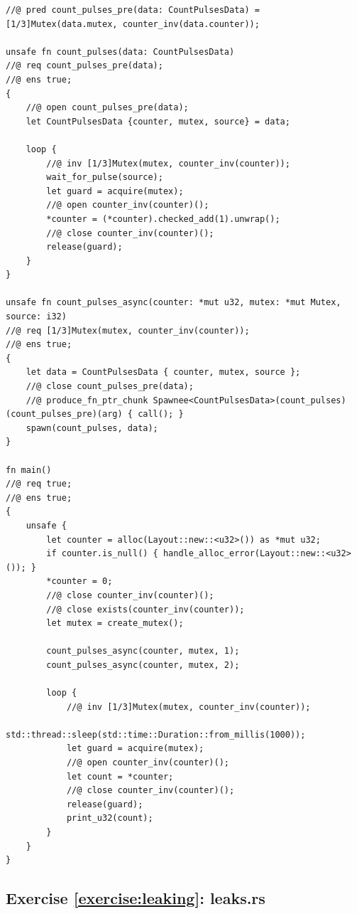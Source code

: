 \documentclass{article}
\begin{document}
\begin{lstlisting}
//@ pred count_pulses_pre(data: CountPulsesData) = [1/3]Mutex(data.mutex, counter_inv(data.counter));

unsafe fn count_pulses(data: CountPulsesData)
//@ req count_pulses_pre(data);
//@ ens true;
{
    //@ open count_pulses_pre(data);
    let CountPulsesData {counter, mutex, source} = data;

    loop {
        //@ inv [1/3]Mutex(mutex, counter_inv(counter));
        wait_for_pulse(source);
        let guard = acquire(mutex);
        //@ open counter_inv(counter)();
        *counter = (*counter).checked_add(1).unwrap();
        //@ close counter_inv(counter)();
        release(guard);
    }
}

unsafe fn count_pulses_async(counter: *mut u32, mutex: *mut Mutex, source: i32)
//@ req [1/3]Mutex(mutex, counter_inv(counter));
//@ ens true;
{
    let data = CountPulsesData { counter, mutex, source };
    //@ close count_pulses_pre(data);
    //@ produce_fn_ptr_chunk Spawnee<CountPulsesData>(count_pulses)(count_pulses_pre)(arg) { call(); }
    spawn(count_pulses, data);
}

fn main()
//@ req true;
//@ ens true;
{
    unsafe {
        let counter = alloc(Layout::new::<u32>()) as *mut u32;
        if counter.is_null() { handle_alloc_error(Layout::new::<u32>()); }
        *counter = 0;
        //@ close counter_inv(counter)();
        //@ close exists(counter_inv(counter));
        let mutex = create_mutex();

        count_pulses_async(counter, mutex, 1);
        count_pulses_async(counter, mutex, 2);

        loop {
            //@ inv [1/3]Mutex(mutex, counter_inv(counter));
            std::thread::sleep(std::time::Duration::from_millis(1000));
            let guard = acquire(mutex);
            //@ open counter_inv(counter)();
            let count = *counter;
            //@ close counter_inv(counter)();
            release(guard);
            print_u32(count);
        }
    }
}
\end{lstlisting}

\subsection{Exercise \ref{exercise:leaking}:
leaks.rs}\label{solution:leaking}
\end{document}
